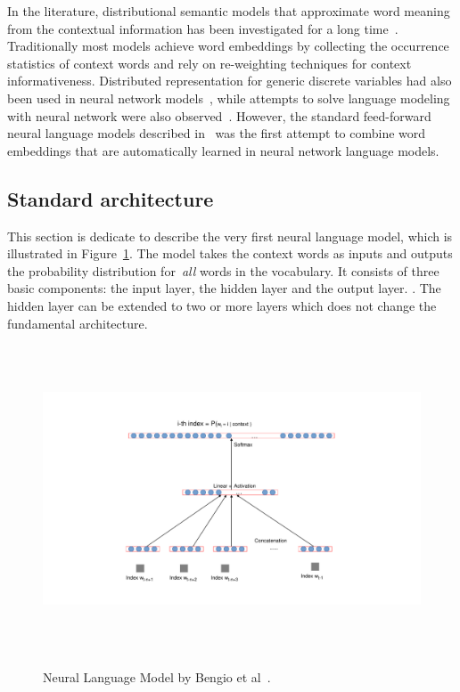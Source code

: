 In the literature, distributional semantic models that approximate word meaning from the contextual information has been investigated for a long time~\cite{miller1991contextual}. Traditionally most models achieve word embeddings by collecting the occurrence statistics of context words and rely on re-weighting techniques for context informativeness. Distributed representation for generic discrete variables had also been used in neural network models~\cite{paccanaro2001learning}, while attempts to solve language modeling with neural network were also observed~\cite{schmidhuber1996sequential}. However, the standard feed-forward neural language models described in~\cite{bengio2003neural} was the first attempt to combine word embeddings that are automatically learned in neural network language models. 

\subsection{Standard architecture}

This section is dedicate to describe the very first neural language model, which is illustrated in Figure~\ref{fig:neuralBengio}. The model takes the context words as inputs and outputs the probability distribution for~\textit{all} words in the vocabulary. It consists of three basic components: the input layer, the hidden layer and the output layer. . The hidden layer can be extended to two or more layers which does not change the fundamental architecture. 

~ \begin{figure}[!t]
~ \centering
~ \includegraphics[width=\columnwidth]{figures/neuralLM.pdf}
~ \caption{Neural Language Model by Bengio et al~\cite{bengio2003neural}.}  
~ \label{fig:neuralBengio}
~ \end{figure}

